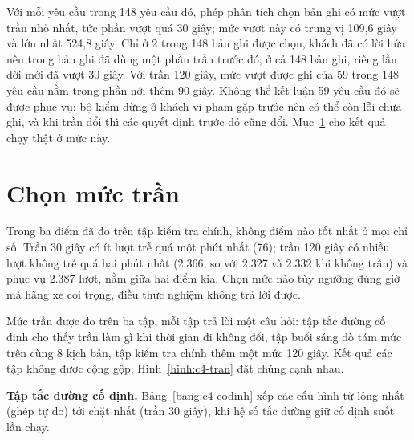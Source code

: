 Với mỗi yêu cầu trong 148 yêu cầu đó, phép phân tích chọn bản ghi có mức vượt trần nhỏ nhất, tức phần vượt quá 30
giây; mức vượt này có trung vị 109,6 giây và lớn nhất 524,8 giây. Chỉ ở 2 trong 148 bản ghi được chọn, khách đã có
lời hứa nêu trong bản ghi đã dùng một phần trần trước đó; ở cả 148 bản ghi, riêng lần dời mới đã vượt 30 giây. Với
trần 120 giây, mức vượt được ghi của 59 trong 148 yêu cầu nằm trong phần nới thêm 90 giây. Không thể kết luận 59 yêu
cầu đó sẽ được phục vụ: bộ kiểm dừng ở khách vi phạm gặp trước nên có thể còn lỗi chưa ghi, và khi trần đổi thì các
quyết định trước đó cũng đổi. Mục~\ref{muc:c4-chontran} cho kết quả chạy thật ở mức này.

\section{Chọn mức trần}
\label{muc:c4-chontran}

Trong ba điểm đã đo trên tập kiểm tra chính, không điểm nào tốt nhất ở mọi chỉ số. Trần 30 giây có ít lượt trễ quá
một phút nhất (76); trần 120 giây có nhiều lượt không trễ quá hai phút nhất (2.366, so với 2.327 và 2.332 khi không
trần) và phục vụ 2.387 lượt, nằm giữa hai điểm kia. Chọn mức nào tùy ngưỡng đúng giờ mà hãng xe coi trọng, điều thực
nghiệm không trả lời được.

Mức trần được đo trên ba tập, mỗi tập trả lời một câu hỏi: tập tắc đường cố định cho thấy trần làm gì khi thời gian
đi không đổi, tập buổi sáng dò tám mức trên cùng 8 kịch bản, tập kiểm tra chính thêm một mức 120 giây. Kết quả các
tập không được cộng gộp; Hình~\ref{hinh:c4-tran} đặt chúng cạnh nhau.

\textbf{Tập tắc đường cố định.} Bảng~\ref{bang:c4-codinh} xếp các cấu hình từ lỏng nhất (ghép tự do) tới chặt nhất
(trần 30 giây), khi hệ số tắc đường giữ cố định suốt lần chạy.

